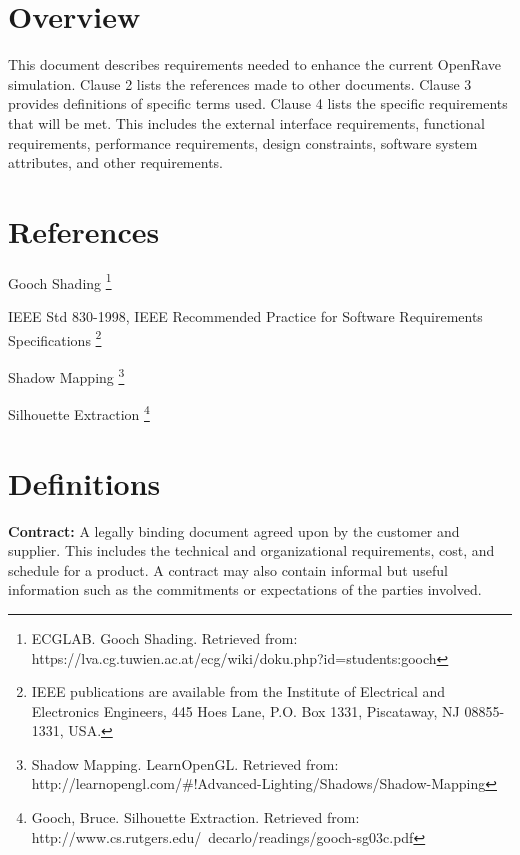 \documentclass[10pt,journal,compsoc]{IEEEtran}
\begin{document}
\newpage
\begin{flushleft}
\section{Overview}
\vspace{3mm}
This document describes requirements needed to enhance the current OpenRave simulation. 
Clause 2 lists the references made to other documents. 
Clause 3 provides definitions of specific terms used.
Clause 4 lists the specific requirements that will be met.
This includes the external interface requirements, functional requirements, performance requirements, design constraints, software system attributes, and other requirements.

\section{References}
\vspace{3mm}

Gooch Shading \footnote{\label{note1}ECGLAB. Gooch Shading. Retrieved from: https://lva.cg.tuwien.ac.at/ecg/wiki/doku.php?id=students:gooch}
\vspace{3mm}

IEEE Std 830-1998, IEEE Recommended Practice for Software Requirements Specifications \footnote{\label{note2}IEEE publications are available from the Institute of Electrical and Electronics Engineers, 445 Hoes Lane, P.O. Box 1331, Piscataway, NJ 08855-1331, USA.}
\vspace{3mm}

Shadow Mapping \footnote{\label{note3} Shadow Mapping. LearnOpenGL. Retrieved from: http://learnopengl.com/\#!Advanced-Lighting/Shadows/Shadow-Mapping}
\vspace{3mm}

Silhouette Extraction \footnote{\label{note4}Gooch, Bruce. Silhouette Extraction. Retrieved from: http://www.cs.rutgers.edu/~decarlo/readings/gooch-sg03c.pdf}

\section{Definitions}

\vspace{3mm}
\textbf{Contract:}
A legally binding document agreed upon by the customer and supplier. This includes the technical and organizational requirements, cost, and schedule for a product. A contract may also contain informal but useful information such as the commitments or expectations of the parties involved.


\end{flushleft}
\end{document}
